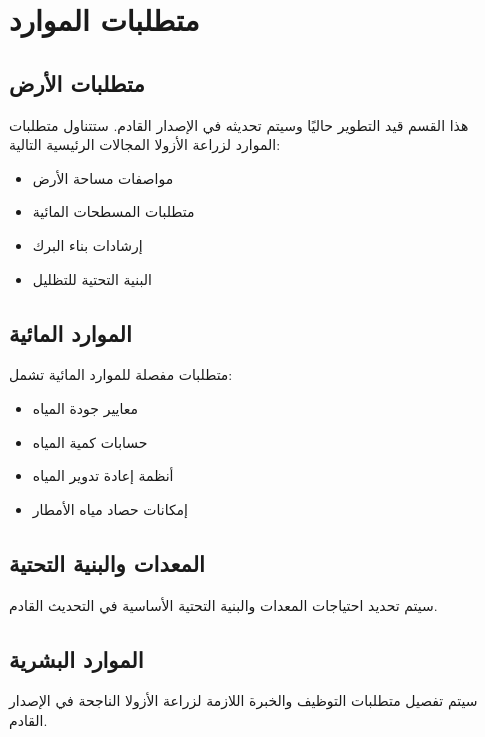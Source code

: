 \section{متطلبات الموارد}

\subsection{متطلبات الأرض}

هذا القسم قيد التطوير حاليًا وسيتم تحديثه في الإصدار القادم. ستتناول متطلبات الموارد لزراعة الأزولا المجالات الرئيسية التالية:

\begin{itemize}
    \item مواصفات مساحة الأرض
    \item متطلبات المسطحات المائية
    \item إرشادات بناء البرك
    \item البنية التحتية للتظليل
\end{itemize}

\subsection{الموارد المائية}

متطلبات مفصلة للموارد المائية تشمل:
\begin{itemize}
    \item معايير جودة المياه
    \item حسابات كمية المياه
    \item أنظمة إعادة تدوير المياه
    \item إمكانات حصاد مياه الأمطار
\end{itemize}

\subsection{المعدات والبنية التحتية}

سيتم تحديد احتياجات المعدات والبنية التحتية الأساسية في التحديث القادم.

\subsection{الموارد البشرية}

سيتم تفصيل متطلبات التوظيف والخبرة اللازمة لزراعة الأزولا الناجحة في الإصدار القادم.
